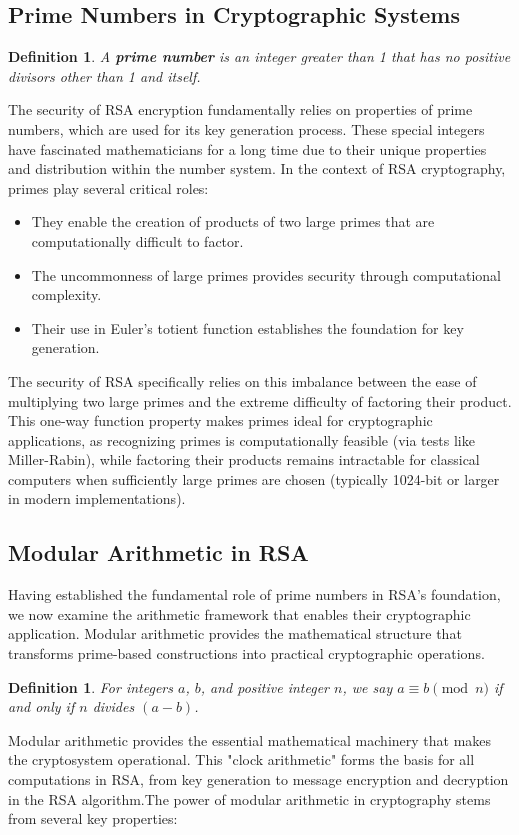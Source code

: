 \documentclass[11pt,a4paper]{article}
\newtheorem{definition}[theorem]{Definition}
\numberwithin{equation}{section}
\begin{document}
\subsection{Prime Numbers in Cryptographic Systems}
\begin{definition} A \textbf{prime number} is an integer greater than 1 that has no positive divisors other than 1 and itself. \end{definition}
\noindent The security of RSA encryption fundamentally relies on properties of prime numbers, which are used for its key generation process. These special integers have fascinated mathematicians for a long time due to their unique properties and distribution within the number system. 
In the context of RSA cryptography, primes play several critical roles:
\begin{itemize}
\item They enable the creation of products of two large primes that are computationally difficult to factor.
\item The uncommonness of large primes provides security through computational complexity.
\item Their use in Euler's totient function establishes the foundation for key generation.
\end{itemize}
The security of RSA specifically relies on this imbalance between the ease of multiplying two large primes and the extreme difficulty of factoring their product. This one-way function property makes primes ideal for cryptographic applications, as recognizing primes is computationally feasible (via tests like Miller-Rabin), while factoring their products remains intractable for classical computers when sufficiently large primes are chosen (typically 1024-bit or larger in modern implementations).

\subsection{Modular Arithmetic in RSA}
Having established the fundamental role of prime numbers in RSA's foundation, we now examine the arithmetic framework that enables their cryptographic application. Modular arithmetic provides the mathematical structure that transforms prime-based constructions into practical cryptographic operations.

\begin{definition}
For integers $a$, $b$, and positive integer $n$, we say $a \equiv b \pmod{n}$ if and only if $n$ divides $(a - b)$.
\end{definition}
\noindent Modular arithmetic provides the essential mathematical machinery that makes the cryptosystem operational. This "clock arithmetic" forms the basis for all computations in RSA, from key generation to message encryption and decryption in the RSA algorithm.The power of modular arithmetic in cryptography stems from several key properties:
\end{document}

